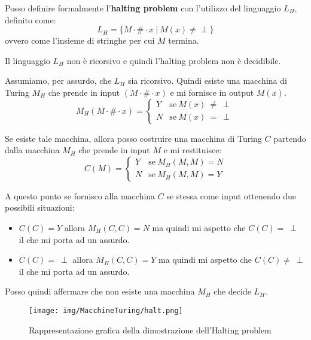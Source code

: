 \begin{definizione}
    Posso definire formalmente l'\textbf{halting problem} con l'utilizzo del 
    linguaggio $L_H$, definito come:
    \begin{equation}
        L_H = \{M \cdot \# \cdot x \ | \ M(x) \neq \perp \}
    \end{equation}
    ovvero come l'insieme di stringhe per cui $M$ termina.
\end{definizione}
\begin{teorema}
    Il linguaggio $L_H$ non è ricorsivo e quindi l'halting problem non è decidibile.
\end{teorema}
\begin{dimostrazione} 
    Assumiamo, per assurdo, che $L_H$ sia ricorsivo. Quindi esiste una macchina 
    di Turing $M_H$ che prende in input $(M \cdot \# \cdot x)$ e mi fornisce in output $M(x)$.
    \begin{equation}
        M_H (M \cdot \# \cdot x) = \begin{cases}
            Y & \text{se} \ M(x) \ \neq \ \perp \\
            N & \text{se} \ M(x) \  = \ \perp
        \end{cases}
    \end{equation}

    Se esiste tale macchina, allora posso costruire una macchina di Turing $C$ 
    partendo dalla macchina $M_H$ che prende in input $M$ e mi restituisce:
    \begin{equation}
        C(M) = \begin{cases}
            Y & \text{se} \ M_H(M, M) = N \\
            N & \text{se} \ M_H(M, M) = Y
        \end{cases}
    \end{equation}

    A questo punto se fornisco alla macchina $C$ se stessa come input ottenendo 
    due possibili situazioni:
    \begin{itemize}
        \item $C(C) = Y$ allora $M_H(C, C) = N$ ma quindi mi aspetto che 
        $C(C)  = \ \perp$ il che mi porta ad un assurdo.
        \item $C(C) =\ \perp$ allora $M_H(C, C) =  Y$ ma quindi mi aspetto che 
        $C(C)  \neq \ \perp$ il che mi porta ad un assurdo.
    \end{itemize}

    Posso quindi affermare che non esiste una macchina $M_H$ che decide $L_H$.
    \begin{figure}
        \centering
        \texttt{[image: img/MacchineTuring/halt.png]}
        \caption{Rappresentazione grafica della dimostrazione dell'Halting problem}
    \end{figure}
\end{dimostrazione}
